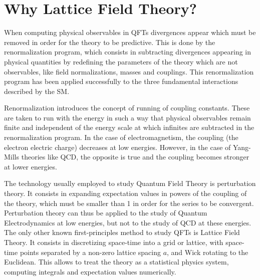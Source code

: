 \section*{Why Lattice Field Theory?}

When computing physical observables in QFTs divergences appear which must be removed in order for the theory to be predictive. This is done by the renormalization program, which consists in subtracting divergences appearing in physical quantities by redefining the parameters of the theory which are not observables, like field normalizations, masses and couplings. This renormalization program has been applied successfully to the three fundamental interactions described by the SM.

Renormalization introduces the concept of running of coupling constants. These are taken to run with the energy in such a way that physical observables remain finite and independent of the energy scale at which infinites are subtracted in the renormalization program.  In the case of electromagnetism, the coupling (the electron electric charge) decreases at low energies. However, in the case of Yang-Mills theories like QCD, the opposite is true and the coupling becomes stronger at lower energies. 

The technology usually employed to study Quantum Field Theory is perturbation theory. It consists in expanding expectation values in powers of the coupling of the theory, which must be smaller than 1 in order for the series to be convergent. Perturbation theory can thus be applied to the study of Quantum Electrodynamics at low energies, but not to the study of QCD at these energies. The only other known first-principles method to study QFTs is Lattice Field Theory. It consists in discretizing space-time into a grid or lattice, with space-time points separated by a non-zero lattice spacing $a$, and Wick rotating to the Euclidean. This allows to treat the theory as a statistical physics system, computing integrals and expectation values numerically. 
 
